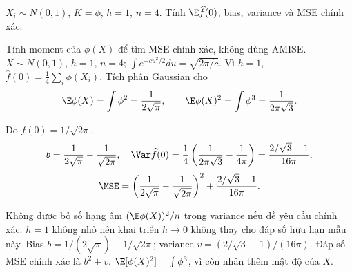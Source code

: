 \begin{problem}\label{k:47}
$X_i\sim N(0,1)$, $K=\phi$, $h=1$, $n=4$. Tính $\E\widehat f(0)$, bias, variance và MSE chính xác.
\end{problem}
\begin{solution}
Tính moment của $\phi(X)$ để tìm MSE chính xác, không dùng AMISE.
$X\sim N(0,1)$, $h=1$, $n=4$; $\int e^{-cu^2/2}du=\sqrt{2\pi/c}$.
Vì $h=1$, $\widehat f(0)=\frac14\sum_i\phi(X_i)$. Tích phân Gaussian cho
\[
 \E\phi(X)=\int\phi^2=\frac1{2\sqrt\pi},\qquad
 \E\phi(X)^2=\int\phi^3=\frac1{2\pi\sqrt3}.
\]

Do $f(0)=1/\sqrt{2\pi}$,
\[
 b=\frac1{2\sqrt\pi}-\frac1{\sqrt{2\pi}},\quad
 \Var\widehat f(0)=\frac14\left(\frac1{2\pi\sqrt3}-\frac1{4\pi}\right)
 =\frac{2/\sqrt3-1}{16\pi},
\]
\[
 \MSE=\left(\frac1{2\sqrt\pi}-\frac1{\sqrt{2\pi}}\right)^2
 +\frac{2/\sqrt3-1}{16\pi}.
\]

Không được bỏ số hạng âm $(\E\phi(X))^2/n$ trong variance nếu đề yêu cầu chính xác. $h=1$ không nhỏ nên khai triển $h\to0$ không thay cho đáp số hữu hạn mẫu này.
Bias $b=1/(2\sqrt\pi)-1/\sqrt{2\pi}$; variance $v=(2/\sqrt3-1)/(16\pi)$. Đáp số MSE chính xác là $b^2+v$.
$\E[\phi(X)^2]=\int\phi^3$, vì còn nhân thêm mật độ của $X$.
\end{solution}

